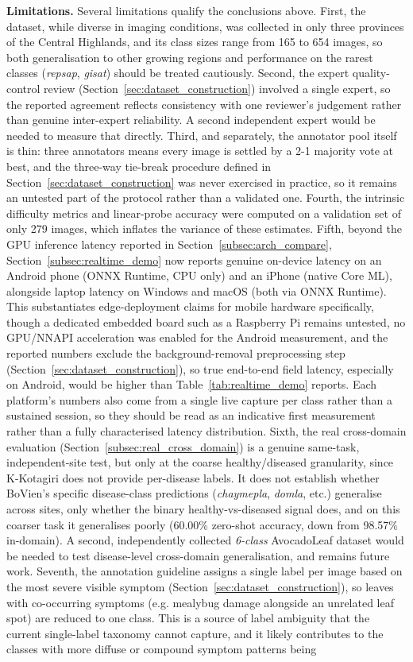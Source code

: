 \textbf{Limitations.} Several limitations qualify the conclusions above. First, the dataset, while diverse in imaging conditions, was collected in only three provinces of the Central Highlands, and its class sizes range from 165 to 654 images, so both generalisation to other growing regions and performance on the rarest classes (\textit{repsap}, \textit{gisat}) should be treated cautiously. Second, the expert quality-control review (Section~\ref{sec:dataset_construction}) involved a single expert, so the reported agreement reflects consistency with one reviewer's judgement rather than genuine inter-expert reliability. A second independent expert would be needed to measure that directly. Third, and separately, the annotator pool itself is thin: three annotators means every image is settled by a 2-1 majority vote at best, and the three-way tie-break procedure defined in Section~\ref{sec:dataset_construction} was never exercised in practice, so it remains an untested part of the protocol rather than a validated one. Fourth, the intrinsic difficulty metrics and linear-probe accuracy were computed on a validation set of only 279 images, which inflates the variance of these estimates. Fifth, beyond the GPU inference latency reported in Section~\ref{subsec:arch_compare}, Section~\ref{subsec:realtime_demo} now reports genuine on-device latency on an Android phone (ONNX Runtime, CPU only) and an iPhone (native Core ML), alongside laptop latency on Windows and macOS (both via ONNX Runtime). This substantiates edge-deployment claims for mobile hardware specifically, though a dedicated embedded board such as a Raspberry Pi remains untested, no GPU/NNAPI acceleration was enabled for the Android measurement, and the reported numbers exclude the background-removal preprocessing step (Section~\ref{sec:dataset_construction}), so true end-to-end field latency, especially on Android, would be higher than Table~\ref{tab:realtime_demo} reports. Each platform's numbers also come from a single live capture per class rather than a sustained session, so they should be read as an indicative first measurement rather than a fully characterised latency distribution. Sixth, the real cross-domain evaluation (Section~\ref{subsec:real_cross_domain}) is a genuine same-task, independent-site test, but only at the coarse healthy/diseased granularity, since K-Kotagiri does not provide per-disease labels. It does not establish whether BoVien's specific disease-class predictions (\textit{chaymepla}, \textit{domla}, etc.) generalise across sites, only whether the binary healthy-vs-diseased signal does, and on this coarser task it generalises poorly (60.00\% zero-shot accuracy, down from 98.57\% in-domain). A second, independently collected \emph{6-class} AvocadoLeaf dataset would be needed to test disease-level cross-domain generalisation, and remains future work. Seventh, the annotation guideline assigns a single label per image based on the most severe visible symptom (Section~\ref{sec:dataset_construction}), so leaves with co-occurring symptoms (e.g. mealybug damage alongside an unrelated leaf spot) are reduced to one class. This is a source of label ambiguity that the current single-label taxonomy cannot capture, and it likely contributes to the classes with more diffuse or compound symptom patterns being 